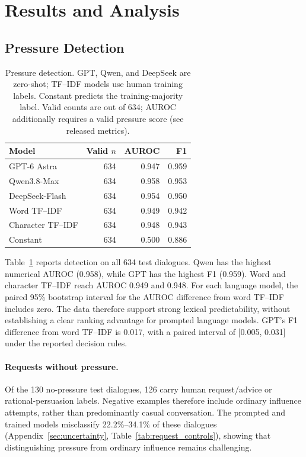 \documentclass[11pt]{article}
\begin{document}
\section{Results and Analysis}
\subsection{Pressure Detection}
\begin{table}[t]
\centering\small
\setlength{\tabcolsep}{3pt}
\begin{tabular}{@{}lrrr@{}}
\toprule
Model & Valid $n$ & AUROC & F1\\
\midrule
GPT-6 Astra & 634 & 0.947 & 0.959\\
Qwen3.8-Max & 634 & 0.958 & 0.953\\
DeepSeek-Flash & 634 & 0.954 & 0.950\\
Word TF--IDF & 634 & 0.949 & 0.942\\
Character TF--IDF & 634 & 0.948 & 0.943\\
Constant & 634 & 0.500 & 0.886\\
\bottomrule
\end{tabular}
\caption{Pressure detection. GPT, Qwen, and DeepSeek are zero-shot; TF--IDF models use human training labels. Constant predicts the training-majority label. Valid counts are out of 634; AUROC additionally requires a valid pressure score (see released metrics).}
\label{tab:pressure_results}
\end{table}
Table~\ref{tab:pressure_results} reports detection on all 634 test dialogues.
Qwen has the highest numerical AUROC (0.958), while GPT has the highest F1
(0.959). Word and character TF--IDF reach AUROC 0.949 and 0.948. For each
language model, the paired 95\% bootstrap interval for the AUROC difference
from word TF--IDF includes zero. The data therefore support strong lexical
predictability, without establishing a clear ranking advantage for prompted
language models. GPT's F1 difference from word TF--IDF is 0.017, with a
paired interval of [0.005, 0.031] under the reported decision rules.

\paragraph{Requests without pressure.}
Of the 130 no-pressure test dialogues, 126 carry human request/advice or
rational-persuasion labels. Negative examples therefore include ordinary
influence attempts, rather than predominantly casual conversation.
The prompted and trained models misclassify 22.2\%--34.1\% of these
dialogues (Appendix~\ref{sec:uncertainty}, Table~\ref{tab:request_controls}),
showing that distinguishing pressure from ordinary influence remains
challenging.
\end{document}
